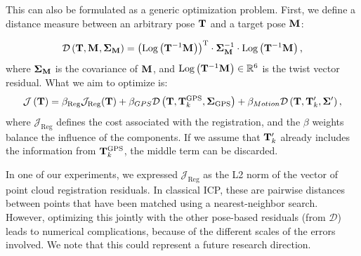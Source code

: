 This can also be formulated as a generic optimization problem. First, we define a distance measure between an arbitrary pose $\mathbf{T}_{}$ and a target pose $\mathbf{M}_{}$:

\newcommand{\customres}{\Log{\pose^{-1} \Mtx{}}}
\newcommand{\dfunc}[1]{\mathcal{D}\left({#1}\right)}
\newcommand{\costreg}{\mathcal{J}_{\text{Reg}}}
\newcommand{\betareg}{\beta_{\text{Reg}}}
\newcommand{\betagps}{\beta_{\text{GPS}}}
\newcommand{\xireg}{\xi_{\text{Reg}}}
\newcommand{\xiicp}{\xi_{\text{ICP}}}
\newcommand{\xigps}{\xi_{\text{GPS}}}
\begin{equation}
	\dfunc{\pose, \Mtx{}, \CovM} = \transpose{\left(\customres\right)} \cdot \CovM^{-1} \cdot \customres
	\comma
\end{equation}
where $\mathbf{\Sigma}_{\mathbf{M}}$ is the covariance of $\mathbf{M}_{}$, and $\customres \in \RR^6$ is the twist vector residual. What we aim to optimize is:
\begin{equation}
	\mathcal{J}\left(\pose\right) =
	\betareg \costreg(\pose) +
	\beta_{GPS} \dfunc{\pose, \tkgps, \covgps} +
	\beta_{Motion} \dfunc{\pose, \pose_k', \matx{\Sigma}'}
	\comma
\end{equation}
where $\costreg$ defines the cost associated with the registration, and the $\beta$ weights balance the influence of the components. If we assume that $\mathbf{T}_k'$ already includes the information from $\mathbf{T}_k^{\text{GPS}}$, the middle term can be discarded.

In one of our experiments, we expressed $\costreg$ as the L2 norm of the vector of point cloud registration residuals. In classical ICP, these are pairwise distances between points that have been matched using a nearest-neighbor search. However, optimizing this jointly with the other pose-based residuals (from $\mathcal{D}$) leads to numerical complications, because of the different scales of the errors involved. We note that this could represent a future research direction.

